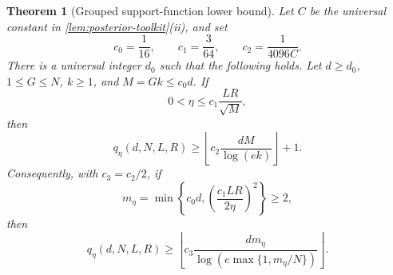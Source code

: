 \documentclass[11pt]{article}
\numberwithin{equation}{section}
\newtheorem{theorem}{Theorem}[section]
\theoremstyle{remark}
\theoremstyle{definition}
\begin{document}
\begin{theorem}[Grouped support-function lower bound]
\label{thm:replicated-support-lower}
Let $C$ be the universal constant in
\cref{lem:posterior-toolkit}(ii), and set
\[
 c_0=\frac1{16},\qquad c_1=\frac3{64},\qquad
 c_2=\frac1{4096C}.
\]
There is a universal integer $d_0$ such that the following holds.
Let $d\ge d_0$, $1\le G\le N$, $k\ge1$, and $M=Gk\le c_0d$.
If
\[
 0<\eta\le c_1\frac{LR}{\sqrt M},
\]
then
\begin{equation}
 q_\eta(d,N,L,R)
 \ge\left\lfloor c_2\frac{dM}{\log(ek)}\right\rfloor+1.
 \label{eq:replicated-lower}
\end{equation}
Consequently, with $c_3=c_2/2$, if
\[
 m_\eta=\min\left\{c_0d,
       \left(\frac{c_1LR}{2\eta}\right)^2\right\}\ge2,
\]
then
\begin{equation}
 q_\eta(d,N,L,R)
 \ge\left\lfloor
 c_3\frac{d m_\eta}
 {\log\!\left(e\max\{1,m_\eta/N\}\right)}
 \right\rfloor.
 \label{eq:replicated-consequence}
\end{equation}
\end{theorem}
\end{document}
